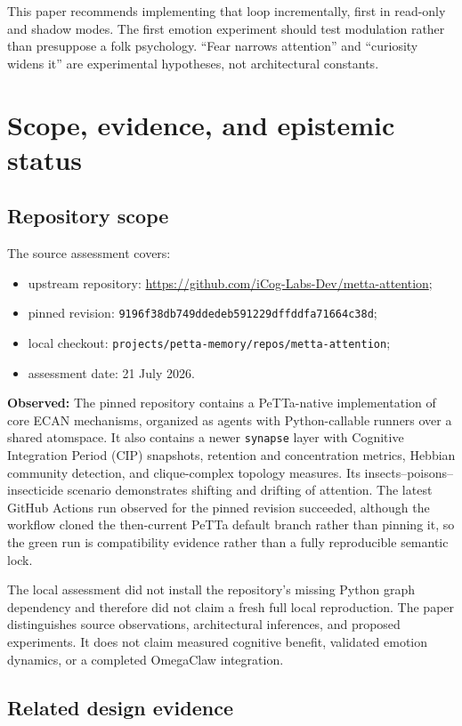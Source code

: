 \documentclass[11pt]{article}
\newcommand{\code}[1]{\texttt{#1}}
\newcommand{\obs}{\textbf{Observed:} }
\begin{document}
This paper recommends implementing that loop incrementally, first in read-only
and shadow modes.  The first emotion experiment should test modulation rather
than presuppose a folk psychology.  ``Fear narrows attention'' and ``curiosity
widens it'' are experimental hypotheses, not architectural constants.

\section{Scope, evidence, and epistemic status}

\subsection{Repository scope}

The source assessment covers:
\begin{itemize}
  \item upstream repository: \url{https://github.com/iCog-Labs-Dev/metta-attention};
  \item pinned revision: \code{9196f38db749ddedeb591229dffddfa71664c38d};
  \item local checkout: \code{projects/petta-memory/repos/metta-attention};
  \item assessment date: 21 July 2026.
\end{itemize}

\obs The pinned repository contains a PeTTa-native implementation of core ECAN
mechanisms, organized as agents with Python-callable runners over a shared
atomspace.  It also contains a newer \code{synapse} layer with Cognitive
Integration Period (CIP) snapshots, retention and concentration metrics,
Hebbian community detection, and clique-complex topology measures.  Its
insects--poisons--insecticide scenario demonstrates shifting and drifting of
attention.  The latest GitHub Actions run observed for the pinned revision
succeeded, although the workflow cloned the then-current PeTTa default branch
rather than pinning it, so the green run is compatibility evidence rather than
a fully reproducible semantic lock.

The local assessment did not install the repository's missing Python graph
dependency and therefore did not claim a fresh full local reproduction.  The
paper distinguishes source observations, architectural inferences, and proposed
experiments.  It does not claim measured cognitive benefit, validated emotion
dynamics, or a completed OmegaClaw integration.

\subsection{Related design evidence}
\end{document}
